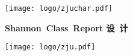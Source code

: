 \thispagestyle{empty}
\setcounter{page}{-1}


\vskip 10mm

\begin{center}
    \texttt{[image: logo/zjuchar.pdf]}
\end{center}

\begin{center}
     \heiti \bfseries
    {
        Shannon~Class~Report
    }
    {
        设~计
    }
\end{center}

\vskip 20pt

\begin{center}
    \texttt{[image: logo/zju.pdf]}
\end{center}

\vskip 20pt

